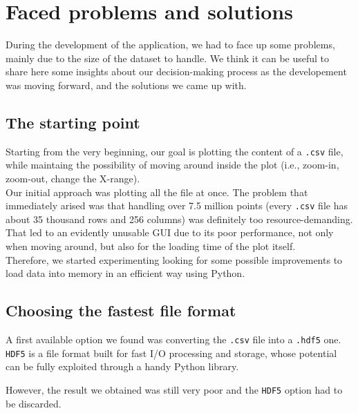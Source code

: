 \documentclass[11pt,a4paper]{article}
\begin{document}

\section{Faced problems and solutions}
\label{sec:faced-problems-and-solutions}

During the development of the application, we had to face up some problems, mainly due to the size of the dataset to handle.
We think it can be useful to share here some insights about our decision-making process as the developement was moving forward, and the solutions we came up with.

\subsection{The starting point}

Starting from the very beginning, our goal is plotting the content of a \texttt{.csv} file, while maintaing the possibility of moving around inside the plot (i.e., zoom-in, zoom-out, change the X-range).\\

Our initial approach was plotting all the file at once. The problem that immediately arised was that handling over 7.5 million points (every \texttt{.csv} file has about 35 thousand rows and 256 columns) was definitely too resource-demanding. That led to an evidently unusable GUI due to its poor performance, not only when moving around, but also for the loading time of the plot itself.\\

Therefore, we started experimenting looking for some possible improvements to load data into memory in an efficient way using Python.\\

\subsection{Choosing the fastest file format}

A first available option we found was converting the \texttt{.csv} file into a \texttt{.hdf5} one. \texttt{HDF5} is a file format built for fast I/O processing and storage, whose potential can be fully exploited through a handy Python library.

However, the result we obtained was still very poor and the \texttt{HDF5} option had to be discarded.\\
\end{document}
